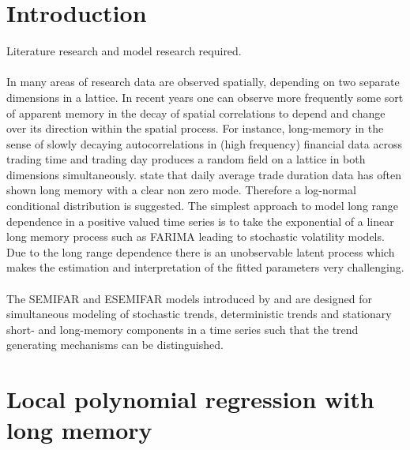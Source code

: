 \documentclass[12pt]{article}
\begin{document}
\section{Introduction}
Literature research and model research required.\\
\\ 
In many areas of research data are observed spatially, depending on two separate dimensions in a lattice. 
In recent years one can observe more frequently some sort of apparent memory in the decay of spatial correlations to depend and change over its direction within the spatial process. 
For instance, long-memory in the sense of slowly decaying autocorrelations in (high frequency) financial data across trading time and trading day produces a random field on a lattice in both dimensions simultaneously. \textcite{beran2015modelling} state that daily average trade duration data has often shown long memory
with a clear non zero mode. Therefore a log-normal conditional distribution is suggested.
The simplest approach to model long range dependence in a positive valued
time series is to take the exponential of a linear long memory process such as
FARIMA leading to stochastic volatility models. Due to the long range dependence
there is an unobservable latent process which makes the estimation and interpretation
of the fitted parameters very challenging.\\
\\
The SEMIFAR and ESEMIFAR models introduced by \textcite{beran2002semifar} and \textcite{beran2015modelling} are designed for simultaneous modeling of stochastic trends, deterministic trends and stationary short- and long-memory components in a time series such that the trend generating mechanisms can be distinguished.

\section{Local polynomial regression with long memory}
\end{document}
